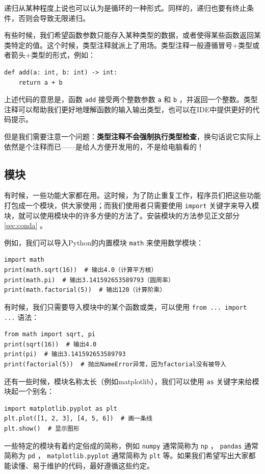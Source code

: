 递归从某种程度上说也可以认为是循环的一种形式。同样的，递归也要有终止条件，否则会导致无限递归。

有些时候，我们希望函数参数只能存入某种类型的数据，或者使得某些函数返回某类特定的值。这个时候，类型注释就派上了用场。类型注释一般遵循冒号+类型或者箭头+类型的形式，例如：
\begin{verbatim}
def add(a: int, b: int) -> int:
    return a + b
\end{verbatim}
上述代码的意思是，函数 \texttt{add} 接受两个整数参数 \texttt{a} 和 \texttt{b} ，并返回一个整数。类型注释可以帮助我们更好地理解函数的输入输出类型，也可以在IDE中提供更好的代码提示。

但是我们需要注意一个问题：\textbf{类型注释不会强制执行类型检查}，换句话说它实际上依然是个注释而已——是给人方便开发用的，不是给电脑看的！

\subsection{模块}
有时候，一些功能大家都在用。这时候，为了防止重复工作，程序员们把这些功能打包成一个模块，供大家使用；而我们使用者只需要使用 \texttt{import} 关键字来导入模块，就可以使用模块中的许多方便的方法了。安装模块的方法参见正文部分 \ref{sec:conda} 。

例如，我们可以导入Python的内置模块 \texttt{math} 来使用数学模块：
\begin{verbatim}
import math
print(math.sqrt(16))  # 输出4.0（计算平方根）
print(math.pi)  # 输出3.141592653589793（圆周率）
print(math.factorial(5))  # 输出120（计算阶乘）
\end{verbatim}

有时候，我们只需要导入模块中的某个函数或类，可以使用 \texttt{from ... import ...} 语法：
\begin{verbatim}
from math import sqrt, pi
print(sqrt(16))  # 输出4.0
print(pi)  # 输出3.141592653589793
print(factorial(5))  # 抛出NameError异常，因为factorial没有被导入
\end{verbatim}

还有一些时候，模块名称太长（例如matplotlib），我们可以使用 \texttt{as} 关键字来给模块起一个别名：
\begin{verbatim}
import matplotlib.pyplot as plt
plt.plot([1, 2, 3], [4, 5, 6])  # 画一条线
plt.show()  # 显示图形
\end{verbatim}

一些特定的模块有着约定俗成的简称，例如 \texttt{numpy} 通常简称为 \texttt{np} ， \texttt{pandas} 通常简称为 \texttt{pd} ， \texttt{matplotlib.pyplot} 通常简称为 \texttt{plt} 等。如果我们希望写出大家都能读懂、易于维护的代码，最好遵循这些约定。

